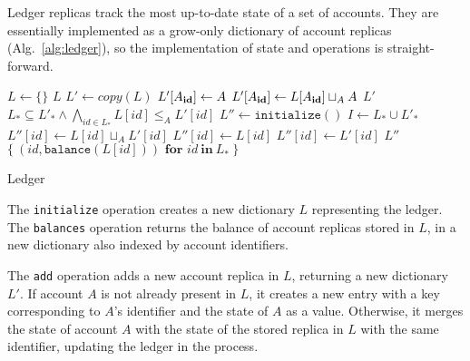 \documentclass[9pt]{article}   	%
\begin{document}
Ledger replicas track the most up-to-date state of a set of accounts. They are essentially implemented as a grow-only dictionary of account replicas (Alg.~\ref{alg:ledger}), so the implementation of state and operations is straight-forward.

\begin{algorithm}
\begin{algorithmic}[1]
    	\State $L \leftarrow \{ \}$ 
    	\State \Return $L$
    \EndFunction
    \State
        \State $L' \leftarrow \textit{copy}(L)$ 
		\State $L'[A_{\scriptsize\textbf{id}}] \leftarrow A$
	\Else
		\State $L'[A_{\scriptsize\textbf{id}}] \leftarrow L[A_{\scriptsize\textbf{id}}] \sqcup_A A$ 
	\EndIf
	\State \Return $L'$
    \EndFunction
    \State
    	\State \Return $L_* \subseteq L'_* \wedge \bigwedge_{id \in L_*} L[id] \leq_A L'[id]$ 
    \EndFunction
    \State
        \State $L'' \leftarrow \texttt{initialize}()$
        \State $I \leftarrow L_* \cup L'_*$
			\State $L''[id] \leftarrow  L[id] \sqcup_A L'[id]$  
			\State $L''[id] \leftarrow L[id]$
		\Else
			\State $L''[id] \leftarrow L'[id]$	
		\EndIf
	\EndFor
	\State \Return $L''$	
    \EndFunction
    \State
        \State \Return $\{~ (\textit{id}, \texttt{balance}(L[id])) \textbf{~for~} id ~\textbf{in}~ L_* ~\}$  
    \EndFunction
\end{algorithmic}
\caption{\label{alg:ledger} Ledger}
\end{algorithm}

The \texttt{initialize} operation creates a new dictionary $L$ representing the ledger. The \texttt{balances} operation returns the balance of account replicas stored in $L$, in a new dictionary also indexed by account identifiers. 

The \texttt{add} operation adds a new account replica in $L$, returning a new dictionary $L'$. If account $A$ is not already present in $L$, it creates a new entry with a key corresponding to $A$'s identifier and the state of $A$ as a value. Otherwise, it merges the state of account $A$ with the state of the stored replica in $L$ with the same identifier, updating the ledger in the process.
\end{document}

